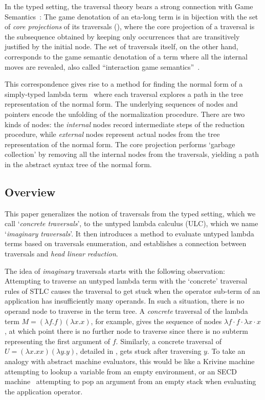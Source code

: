 \documentclass[xchauthor,chkrefs,GCNS,amsmath,amsthm,rotating,leaveRGB]{tcsg}
\theoremstyle{plain}
\theoremstyle{definition}
\begin{document}
In the typed setting, the traversal theory bears a strong connection with
Game Semantics~\cite{BlumPhd}: The game denotation of an eta-long term is in
bijection with the set of \emph{core projections} of its traversals
(), where the core
projection of a traversal is the subsequence obtained by keeping only
occurrences that are transitively justified by the initial node. The set of
traversals itself, on the other hand, corresponds to the game semantic
denotation of a term where all the internal moves are revealed, also called
``interaction game semantics''~\cite{BlumPhd}.

This correspondence gives rise to a method for finding the normal form of a
simply-typed lambda term~\cite{BlumPhd,BlumGalop2008,Blum-LocalBeta2008}
where each traversal explores a path in the tree representation of the normal
form. The underlying sequences of nodes and pointers encode the unfolding of
the normalization procedure. There are two kinds of nodes: the
\emph{internal} nodes record intermediate steps of the reduction procedure,
while \emph{external} nodes represent actual nodes from the tree
representation of the normal form. The core projection performs `garbage
collection' by removing all the internal nodes from the traversals,  yielding
a path in the abstract syntax tree of the normal form.


\subsection{Overview}\label{sec1.2}

This paper generalizes the notion of traversals from the typed setting, which
we call `\emph{concrete traversals}', to the untyped lambda calculus (ULC),
which we name `\emph{imaginary traversals}'. It then introduces a method to
evaluate untyped lambda terms based on traversals enumeration, and
establishes a connection between traversals and \emph{head linear reduction}.

The idea of \emph{imaginary} traversals starts with the following
observation: Attempting to traverse an untyped lambda term with the
`concrete' traversal rules of STLC causes the traversal to get stuck when the
operator sub-term of an application has insufficiently many operands. In such
a situation, there is no operand node to traverse in the term tree. A
\emph{concrete} traversal of the lambda term $M = (\lambda f.f)(\lambda
x.x)$, for example, gives the sequence of nodes $\lambda f \cdot f \cdot
\lambda x \cdot x$, at which point there is no further node to traverse since
there is no subterm representing the first argument of $f$. Similarly, a
concrete traversal of $U = (\lambda x. x x)(\lambda y. y)$, detailed in
, gets stuck after traversing $y$. To take
an analogy with abstract machine evaluators, this would be like a Krivine
machine~\cite{Krivine2007} attempting to lookup a variable from an empty
environment, or an SECD machine~\cite{landin-secd} attempting to pop an
argument from an empty stack when evaluating the application operator.
\end{document}
